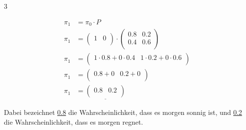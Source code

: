 \begin{landscape}
\begin{multicols*}{3}
\begin{cheatSheetBox}[title=Vorhersage von Zuständen]
			\[\begin{aligned}
					\pi_1 & = \pi_0 \cdot P                               \\
					\pi_1 & =
					\begin{pmatrix}
						1 & 0 \\
					\end{pmatrix}
					\cdot
					\begin{pmatrix}
						0.8 & 0.2 \\
						0.4 & 0.6 \\
					\end{pmatrix}                                        \\
					\pi_1 & =
					\begin{pmatrix}
						1 \cdot 0.8 + 0 \cdot 0.4 & 1 \cdot 0.2 + 0 \cdot 0.6 \\
					\end{pmatrix} \\
					\pi_1 & =
					\begin{pmatrix}
						0.8 + 0 & 0.2 + 0 \\
					\end{pmatrix}                                     \\
					\pi_1 & =
					\underline{
						\begin{pmatrix}
							0.8 & 0.2 \\
						\end{pmatrix}
					}
				\end{aligned}\]

			Dabei bezeichnet \underline{0.8} die Wahrscheinlichkeit, dass es morgen sonnig ist, und \underline{0.2} die Wahrscheinlichkeit, dass es morgen regnet.


\end{cheatSheetBox}
\end{multicols*}
\end{landscape}
